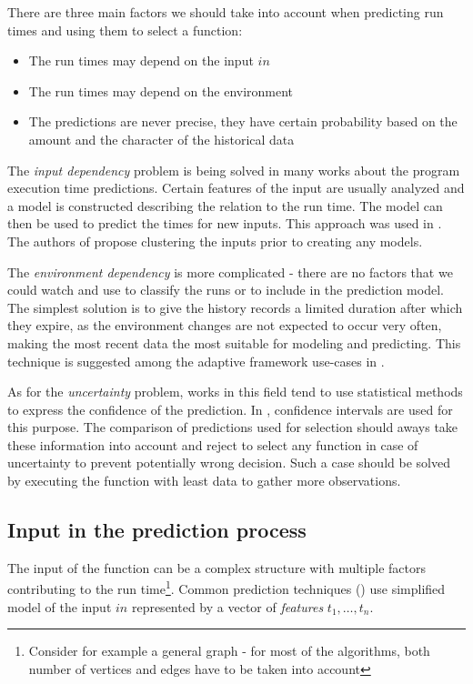 There are three main factors we should take into account when predicting run times and using them to select a function:

\begin{itemize}
	\item The run times may depend on the input $in$
	\item The run times may depend on the environment
	\item The predictions are never precise, they have certain probability based on the amount and the character of the historical data
\end{itemize}

The \textit{input dependency} problem is being solved in many works about the program execution time predictions. Certain features of the input are usually analyzed and a model is constructed describing the relation to the run time. The model can then be used to predict the times for new inputs. This approach was used in \cite{chun_mantis:_2010,goldsmith_measuring_2007}. The authors of \cite{smith_predicting_1998} propose clustering the inputs prior to creating any models.

The \textit{environment dependency} is more complicated - there are no factors that we could watch and use to classify the runs or to include in the prediction model. The simplest solution is to give the history records a limited duration after which they expire, as the environment changes are not expected to occur very often, making the most recent data the most suitable for modeling and predicting. This technique is suggested among the adaptive framework use-cases in \cite{bulej_performance_2012}.

As for the \textit{uncertainty} problem, works in this field tend to use statistical methods to express the confidence of the prediction. In \cite{smith_predicting_1998}, confidence intervals are used for this purpose. The comparison of predictions used for selection should aways take these information into account and reject to select any function in case of uncertainty to prevent potentially wrong decision. Such a case should be solved by executing the function with least data to gather more observations.

\subsection{Input in the prediction process}
\label{subsec:input_in_selection}

The input of the function can be a complex structure with multiple factors contributing to the run time\footnote{Consider for example a general graph - for most of the algorithms, both number of vertices and edges have to be taken into account}. Common prediction techniques (\cite{chun_mantis:_2010,goldsmith_measuring_2007}) use simplified model of the input $in$ represented by a vector of \textit{features} $t_1, \dots, t_n$. 

